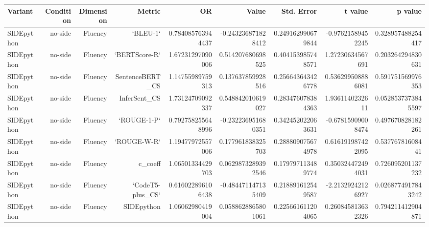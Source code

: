 \begin{tabular}{lrrrrrrrr}
\hline
Variant & Condition & Dimension & Metric & OR & Value & Std. Error & t value & p value
\\
\hline
SIDEpython & no-side & Fluency & `BLEU-1` & 0.784085763944437 & -0.243236871828412 & 0.249162990679844 & -0.97621589452245 & 0.328957488254417
\\
SIDEpython & no-side & Fluency & `BERTScore-R` & 1.67231297090006 & 0.514207680698525 & 0.404153985748571 & 1.27230634567691 & 0.203264294830631
\\
SIDEpython & no-side & Fluency & SentenceBERT\_CS & 1.14755989759313 & 0.137637859928516 & 0.256643643426778 & 0.536299508886081 & 0.591751569976353
\\
SIDEpython & no-side & Fluency & InferSent\_CS & 1.73124709092337 & 0.548842010619027 & 0.283476078384363 & 1.9361140232611 & 0.0528537373845597
\\
SIDEpython & no-side & Fluency & `ROUGE-1-P` & 0.792758255648996 & -0.232236951680351 & 0.342452022063631 & -0.67815909008474 & 0.497670828182261
\\
SIDEpython & no-side & Fluency & `ROUGE-W-R` & 1.19477972557006 & 0.177961838325703 & 0.288809075674978 & 0.616191987422095 & 0.53776781608441
\\
SIDEpython & no-side & Fluency & c\_coeff & 1.06501334429703 & 0.0629873289392546 & 0.179797113489774 & 0.350324472494031 & 0.726095201137232
\\
SIDEpython & no-side & Fluency & `CodeT5-plus\_CS` & 0.616022896106438 & -0.484471147135409 & 0.218891612549587 & -2.21329242126927 & 0.0268774917843242
\\
SIDEpython & no-side & Fluency & SIDEpython & 1.06062980419004 & 0.0588628865801061 & 0.225661611204065 & 0.260845813632326 & 0.794211412904871
\\
\hline
\end{tabular}
